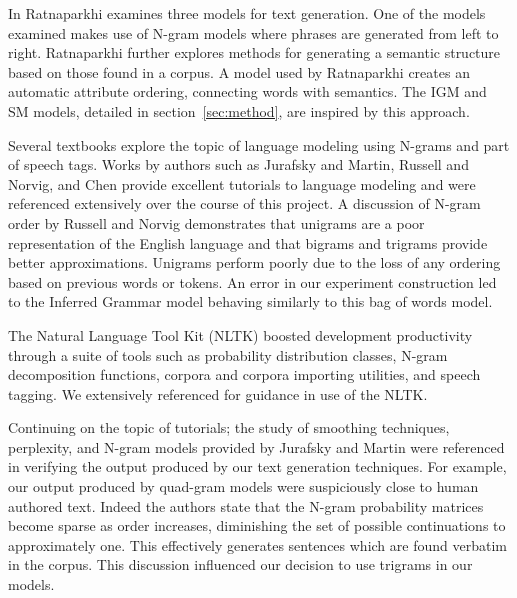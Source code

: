 \documentclass[ai15_group61_report.tex]{subfiles}
\begin{document}

In \cite{Ratnaparkhi00} Ratnaparkhi examines three models for text generation. One of the models examined makes use of N-gram models where phrases are generated from left to right. Ratnaparkhi further explores methods for generating a semantic structure based on those found in a corpus. A model used by Ratnaparkhi creates an automatic attribute ordering, connecting words with semantics. The IGM and SM models, detailed in section~\ref{sec:method}, are inspired by this approach. 

Several textbooks explore the topic of language modeling using N-grams and part of speech tags. Works by authors such as Jurafsky and Martin\cite{Jurafsky2000}, Russell and Norvig\cite{RussellNorvigAIBook3rd}, and Chen\cite{chen-smoothing} provide excellent tutorials to language modeling and were referenced extensively over the course of this project. A discussion of N-gram order by Russell and Norvig demonstrates that unigrams are a poor representation of the English language and that bigrams and trigrams provide better approximations. Unigrams perform poorly due to the loss of any ordering based on previous words or tokens. An error in our experiment construction led to the Inferred Grammar model behaving similarly to this bag of words model.

The Natural Language Tool Kit (NLTK) boosted development productivity through a suite of tools such as probability distribution classes, N-gram decomposition functions, corpora and corpora importing utilities, and speech tagging. We extensively referenced \cite{NLTKBook09} for guidance in use of the NLTK. 

Continuing on the topic of tutorials; the study of smoothing techniques, perplexity, and N-gram models provided by Jurafsky and Martin\cite{Jurafsky2000} were referenced in verifying the output produced by our text generation techniques. For example, our output produced by quad-gram models were suspiciously close to human authored text. Indeed the authors state that the N-gram probability matrices become sparse as order increases, diminishing the set of possible continuations to approximately one. This effectively generates sentences which are found verbatim in the corpus. This discussion influenced our decision to use trigrams in our models. 
\end{document}
